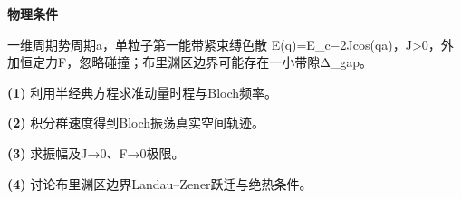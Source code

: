 \textbf{物理条件}\par 一维周期势周期a，单粒子第一能带紧束缚色散 E(q)=E\_c−2Jcos(qa)，J>0，外加恒定力F，忽略碰撞；布里渊区边界可能存在一小带隙Δ\_gap。
\par\noindent\textbf{(1)} 利用半经典方程求准动量时程与Bloch频率。
\par\noindent\textbf{(2)} 积分群速度得到Bloch振荡真实空间轨迹。
\par\noindent\textbf{(3)} 求振幅及J→0、F→0极限。
\par\noindent\textbf{(4)} 讨论布里渊区边界Landau–Zener跃迁与绝热条件。

